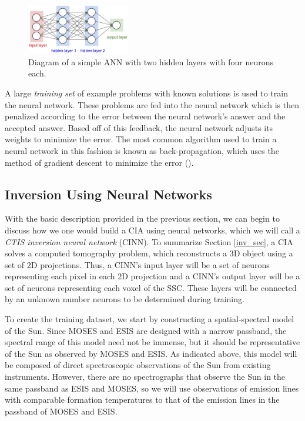 \documentclass[10pt, letter]{article}
\begin{document}
			\begin{figure}[h!]
				\centering
				\includegraphics[width=0.4\textwidth]{figures/ann2}
				\caption{Diagram of a simple ANN with two hidden layers with four neurons each.}
				\label{ann_fig}
			\end{figure}
			
			A large \textit{training set} of example problems with known solutions is used to train the neural network. These problems are fed into the neural network which is then penalized according to the error between the neural network's answer and the accepted answer. Based off of this feedback, the neural network adjusts its weights to minimize the error. The most common algorithm used to train a neural network in this fashion is known as back-propagation, which uses the method of gradient descent to minimize the error (\cite{ai}).
		
		\subsection{Inversion Using Neural Networks}
		
			With the basic description provided in the previous section, we can begin to discuss how we one would build a CIA using neural networks, which we will call a \textit{CTIS inversion neural network} (CINN). To summarize Section \ref{inv_sec}, a CIA solves a computed tomography problem, which reconstructs a 3D object using a set of 2D projections. Thus, a CINN's input layer will be a set of neurons representing each pixel in each 2D projection and a CINN's output layer will be a set of neurons representing each voxel of the SSC. These layers will be connected by an unknown number neurons to be determined during training. 
					
			To create the training dataset, we start by constructing a spatial-spectral model of the Sun. Since MOSES and ESIS are designed with a narrow passband, the spectral range of this model need not be immense, but it should be representative of the Sun as observed by MOSES and ESIS. As indicated above, this model will be composed of direct spectroscopic observations of the Sun from existing instruments. However, there are no spectrographs that observe the Sun in the same passband as ESIS and MOSES, so we will use observations of emission lines with comparable formation temperatures to that of the emission lines in the passband of MOSES and ESIS. 
			
\end{document}
